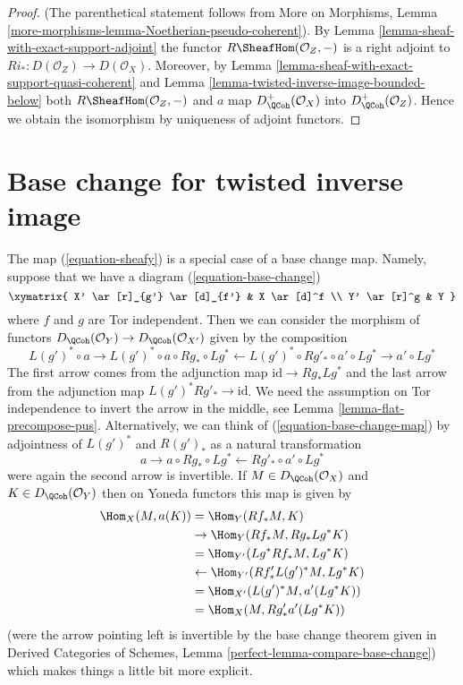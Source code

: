 \begin{proof}
(The parenthetical statement follows from More on Morphisms, Lemma
\ref{more-morphisms-lemma-Noetherian-pseudo-coherent}).
By Lemma \ref{lemma-sheaf-with-exact-support-adjoint}
the functor $R\SheafHom(\mathcal{O}_Z, -)$ is a right adjoint
to $Ri_* : D(\mathcal{O}_Z) \to D(\mathcal{O}_X)$. Moreover,
by Lemma \ref{lemma-sheaf-with-exact-support-quasi-coherent}
and Lemma \ref{lemma-twisted-inverse-image-bounded-below}
both $R\SheafHom(\mathcal{O}_Z, -)$ and $a$ map
$D_\QCoh^+(\mathcal{O}_X)$ into $D_\QCoh^+(\mathcal{O}_Z)$.
Hence we obtain the isomorphism by uniqueness of adjoint
functors.
\end{proof}






\section{Base change for twisted inverse image}
\label{section-base-change-map}

\noindent
The map (\ref{equation-sheafy}) is a special case of a base change map.
Namely, suppose that we have a diagram (\ref{equation-base-change})
$$
\xymatrix{
X' \ar[r]_{g'} \ar[d]_{f'} & X \ar[d]^f \\
Y' \ar[r]^g & Y
}
$$
where $f$ and $g$ are Tor independent. Then we can consider the
morphism of functors
$D_\QCoh(\mathcal{O}_Y) \to D_\QCoh(\mathcal{O}_{X'})$
given by the composition
\begin{equation}
\label{equation-base-change-map}
L(g')^* \circ a \to
L(g')^* \circ a \circ Rg_* \circ Lg^* \leftarrow
L(g')^* \circ Rg'_* \circ a' \circ Lg^* \to a' \circ Lg^*
\end{equation}
The first arrow comes from the adjunction map $\text{id} \to Rg_* Lg^*$
and the last arrow from the adjunction map $L(g')^*Rg'_* \to \text{id}$.
We need the assumption on Tor independence to invert the arrow
in the middle, see Lemma \ref{lemma-flat-precompose-pus}.
Alternatively, we can think of (\ref{equation-base-change-map}) by
adjointness of $L(g')^*$ and $R(g')_*$ as a natural transformation
$$
a \to a \circ Rg_* \circ Lg^* \leftarrow Rg'_* \circ a' \circ Lg^*
$$
were again the second arrow is invertible. If $M \in D_\QCoh(\mathcal{O}_X)$
and $K \in D_\QCoh(\mathcal{O}_Y)$
then on Yoneda functors this map is given by
\begin{align*}
\Hom_X(M, a(K))
& =
\Hom_Y(Rf_*M, K) \\
& \to
\Hom_Y(Rf_*M, Rg_* Lg^*K) \\
& =
\Hom_{Y'}(Lg^*Rf_*M, Lg^*K) \\
& \leftarrow
\Hom_{Y'}(Rf'_* L(g')^*M, Lg^*K) \\
& =
\Hom_{X'}(L(g')^*M, a'(Lg^*K)) \\
& =
\Hom_X(M, Rg'_*a'(Lg^*K))
\end{align*}
(were the arrow pointing left is invertible by the base
change theorem given in
Derived Categories of Schemes, Lemma \ref{perfect-lemma-compare-base-change})
which makes things a little bit more explicit.

